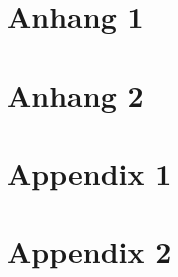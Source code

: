 \ifnum{}
  \section{Anhang 1}
  \section{Anhang 2}
\else
  \section{Appendix 1}
  \section{Appendix 2}
\fi
